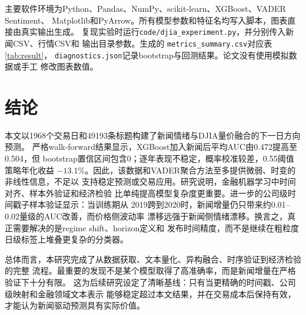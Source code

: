 \documentclass[UTF8,a4paper,10pt,twocolumn,fontset=none]{ctexart}
\begin{document}
主要软件环境为Python、Pandas、NumPy、scikit-learn、XGBoost、VADER Sentiment、
Matplotlib和PyArrow。所有模型参数和特征名均写入脚本，图表直接由真实输出生成。
复现实验时运行\texttt{code/djia\_experiment.py}，并分别传入新闻CSV、行情CSV和
输出目录参数。生成的
\texttt{metrics\_summary.csv}对应表\ref{tab:result}，
\texttt{diagnostics.json}记录bootstrap与回测结果。论文没有使用模拟数据或手工
修改图表数值。

\FloatBarrier

\section{结论}

本文以1968个交易日和49193条标题构建了新闻情绪与DJIA量价融合的下一日方向预测。
严格walk-forward结果显示，XGBoost加入新闻后平均AUC由0.472提高至0.504，但
bootstrap置信区间包含0；逐年表现不稳定，概率校准较差，0.55阈值策略年化收益
$-13.1\%$。因此，该数据和VADER聚合方法至多提供微弱、时变的非线性信息，不足以
支持稳定预测或交易应用。研究说明，金融机器学习中时间对齐、样本外验证和经济检验
比单纯提高模型复杂度更重要。进一步的公司级时间戳子样本验证显示：当训练期从
2019跨到2020时，新闻增量仍只带来约0.01--0.02量级的AUC改善，而价格侧波动率
漂移远强于新闻侧情绪漂移。换言之，真正需要解决的是regime shift、horizon定义和
发布时间精度，而不是继续在粗粒度日级标签上堆叠更复杂的分类器。

总体而言，本研究完成了从数据获取、文本量化、异构融合、时序验证到经济检验的完整
流程。最重要的发现不是某个模型取得了高准确率，而是新闻增量在严格验证下十分有限。
这为后续研究设定了清晰基线：只有当更精确的时间戳、公司级映射和金融领域文本表示
能够稳定超过本文结果，并在交易成本后保持有效，才能认为新闻驱动预测具有实际价值。
\end{document}
